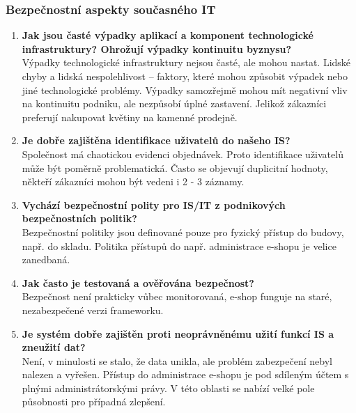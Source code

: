 \documentclass{article}
\begin{document}
\subsubsection*{Bezpečnostní aspekty současného IT}
\begin{enumerate}
    \item \textbf{Jak jsou časté výpadky aplikací a komponent technologické infrastruktury? Ohrožují výpadky kontinuitu byznysu?} \\
        Výpadky technologické infrastruktury nejsou časté, ale mohou nastat. Lidské chyby a lidská nespolehlivost -- faktory, které mohou způsobit výpadek nebo jiné technologické problémy. Výpadky samozřejmě mohou mít negativní vliv na kontinuitu podniku, ale nezpůsobí úplné zastavení. Jelikož zákazníci preferují nakupovat květiny na kamenné prodejně.

    \item \textbf{Je dobře zajištěna identifikace uživatelů do našeho IS?} \\
        Společnost má chaotickou evidenci objednávek. Proto identifikace uživatelů může být poměrně problematická. Často se objevují duplicitní hodnoty, někteří zákazníci mohou být vedeni i 2 - 3 záznamy.

    \item \textbf{Vychází bezpečnostní polity pro IS/IT z podnikových bezpečnostních politik?} \\
        Bezpečnostní politiky jsou definované pouze pro fyzický přístup do budovy, např. do skladu. Politika přístupů do např. administrace e-shopu je velice zanedbaná.

    \item \textbf{Jak často je testovaná a ověřována bezpečnost?} \\
        Bezpečnost není prakticky vůbec monitorovaná, e-shop funguje na staré, nezabezpečené verzi frameworku.

    \item \textbf{Je systém dobře zajištěn proti neoprávněnému užití funkcí IS a zneužití dat?} \\
        Není, v minulosti se stalo, že data unikla, ale problém zabezpečení nebyl nalezen a vyřešen. Přístup do administrace e-shopu je pod sdíleným účtem s plnými administrátorskými právy. V této oblasti se nabízí velké pole působnosti pro případná zlepšení.
\end{enumerate}
\end{document}
